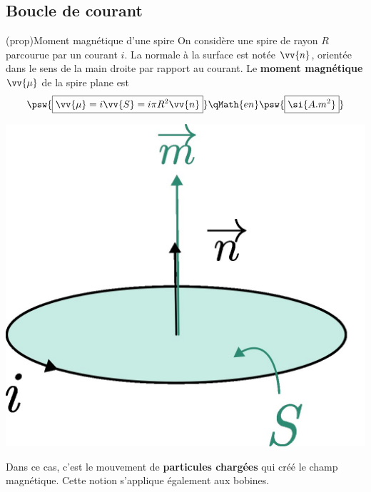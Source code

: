 \documentclass[../../main/main.tex]{subfiles}
\begin{document}
\subsection{Boucle de courant}
\label{ssec:magboucle}
\begin{tcb*}[sidebyside, righthand ratio=.2](prop){Moment magnétique d'une spire}
	On considère une spire de rayon $R$ parcourue par un courant $i$. La normale à
	la surface est notée $\vv{n}$, orientée dans le sens de la main droite par
	rapport au courant.
	\smallbreak
	Le \textbf{moment magnétique} $\vv{\mu}$ de la spire plane est
	\[
		\psw{\boxed{\vv{\mu} = i \vv{S} = i\pi R^2 \vv{n}}}
		\qMath{en}
		\psw{\boxed{\si{A.m^2}}}
	\]
	\tcblower
	\begin{center}
		\includegraphics[width=\linewidth]{momag_spire}
	\end{center}
\end{tcb*}

Dans ce cas, c'est le mouvement de \textbf{particules chargées} qui créé le
champ magnétique. Cette notion s'applique également aux bobines.
\end{document}
